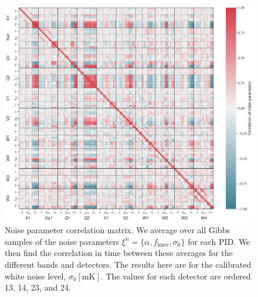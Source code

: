 \documentclass[twocolumn]{../../common/aa}
\begin{document}
\begin{figure}[t]
	\centering
	\includegraphics[width=\textwidth]{figures/noise_parameter_correlation.pdf}
	\caption{Noise parameter correlation matrix. We average over all Gibbs samples of the noise parameters $\xi^n=\{\alpha,f_\mathrm{knee},\sigma_0\}$ for each PID. We then find the correlation in time between these averages for the different bands and detectors. The results here are for the calibrated white noise level, $\sigma_0[\mathrm{mK}]$. The values for each detector are ordered 13, 14, 23, and 24.}
	\label{fig:correlation}
\end{figure}
\end{document}
